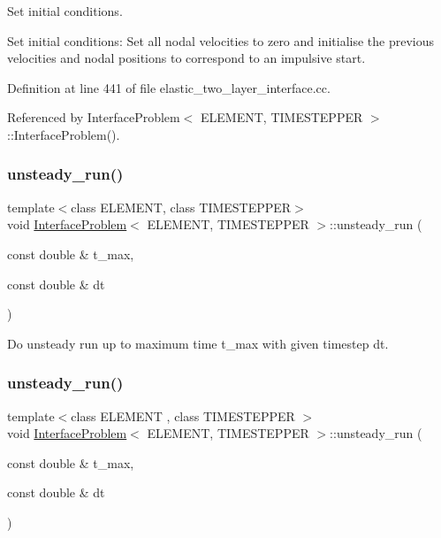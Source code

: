 Set initial conditions. 

Set initial conditions\+: Set all nodal velocities to zero and initialise the previous velocities and nodal positions to correspond to an impulsive start. 

Definition at line 441 of file elastic\+\_\+two\+\_\+layer\+\_\+interface.\+cc.



Referenced by Interface\+Problem$<$ E\+L\+E\+M\+E\+N\+T, T\+I\+M\+E\+S\+T\+E\+P\+P\+E\+R $>$\+::\+Interface\+Problem().

\mbox{\label{classInterfaceProblem_adf1f4e43d10939e4323e0e315b711085}} 
\subsubsection{\texorpdfstring{unsteady\+\_\+run()}{unsteady\_run()}\hspace{0.1cm}{\footnotesize\ttfamily [1/2]}}
{\footnotesize\ttfamily template$<$class E\+L\+E\+M\+E\+NT, class T\+I\+M\+E\+S\+T\+E\+P\+P\+ER$>$ \\
void \hyperlink{classInterfaceProblem}{Interface\+Problem}$<$ E\+L\+E\+M\+E\+NT, T\+I\+M\+E\+S\+T\+E\+P\+P\+ER $>$\+::unsteady\+\_\+run (\begin{DoxyParamCaption}\item[{const double \&}]{t\+\_\+max,  }\item[{const double \&}]{dt }\end{DoxyParamCaption})}



Do unsteady run up to maximum time t\+\_\+max with given timestep dt. 

\mbox{\label{classInterfaceProblem_adf1f4e43d10939e4323e0e315b711085}} 
\subsubsection{\texorpdfstring{unsteady\+\_\+run()}{unsteady\_run()}\hspace{0.1cm}{\footnotesize\ttfamily [2/2]}}
{\footnotesize\ttfamily template$<$class E\+L\+E\+M\+E\+NT , class T\+I\+M\+E\+S\+T\+E\+P\+P\+ER $>$ \\
void \hyperlink{classInterfaceProblem}{Interface\+Problem}$<$ E\+L\+E\+M\+E\+NT, T\+I\+M\+E\+S\+T\+E\+P\+P\+ER $>$\+::unsteady\+\_\+run (\begin{DoxyParamCaption}\item[{const double \&}]{t\+\_\+max,  }\item[{const double \&}]{dt }\end{DoxyParamCaption})}



